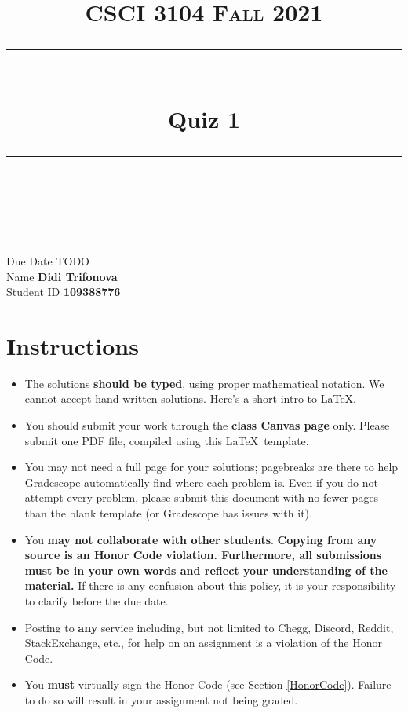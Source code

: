 \documentclass[11pt]{article}
\title{
\normalfont \normalsize 
\textsc{CSCI 3104 Fall 2021} \\
[10pt] 
\rule{\linewidth}{0.5pt} \\[6pt] 
\huge Quiz 1 \\
\rule{\linewidth}{2pt}  \\[10pt]
}
\date{}
\theoremstyle{definition}
\theoremstyle{definition}
\theoremstyle{definition}
\begin{document}
\maketitle


\noindent
Due Date \dotfill TODO \\
Name \dotfill \textbf{Didi Trifonova} \\
Student ID \dotfill \textbf{109388776} \\


\tableofcontents

\section{Instructions}
 \begin{itemize}
	\item The solutions \textbf{should be typed}, using proper mathematical notation. We cannot accept hand-written solutions. \href{http://ece.uprm.edu/~caceros/latex/introduction.pdf}{Here's a short intro to \LaTeX.}
	\item You should submit your work through the \textbf{class Canvas page} only. Please submit one PDF file, compiled using this \LaTeX \ template.
	\item You may not need a full page for your solutions; pagebreaks are there to help Gradescope automatically find where each problem is. Even if you do not attempt every problem, please submit this document with no fewer pages than the blank template (or Gradescope has issues with it).

	\item You \textbf{may not collaborate with other students}. \textbf{Copying from any source is an Honor Code violation. Furthermore, all submissions must be in your own words and reflect your understanding of the material.} If there is any confusion about this policy, it is your responsibility to clarify before the due date. 

	\item Posting to \textbf{any} service including, but not limited to Chegg, Discord, Reddit, StackExchange, etc., for help on an assignment is a violation of the Honor Code.

	\item You \textbf{must} virtually sign the Honor Code (see Section \ref{HonorCode}). Failure to do so will result in your assignment not being graded.
\end{itemize}
\end{document}
